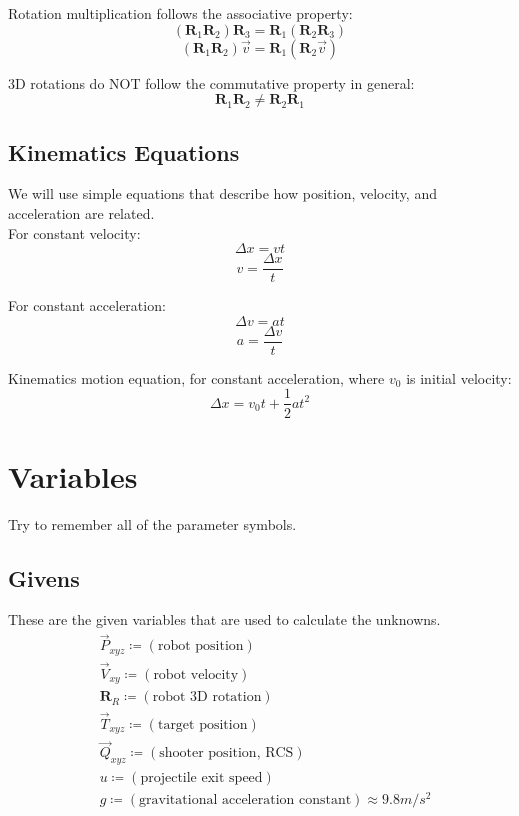 \documentclass{article}
\begin{document}
Rotation multiplication follows the associative property:
\[ (\boldsymbol{R}_1\boldsymbol{R}_2)\boldsymbol{R}_3=\boldsymbol{R}_1(\boldsymbol{R}_2\boldsymbol{R}_3) \]
\[ (\boldsymbol{R}_1\boldsymbol{R}_2)\vec{v}=\boldsymbol{R}_1(\boldsymbol{R}_2\vec{v}) \]

3D rotations do NOT follow the commutative property in general:
$$\boldsymbol{R}_1\boldsymbol{R}_2\ne\boldsymbol{R}_2\boldsymbol{R}_1$$

\subsection*{Kinematics Equations}
We will use simple equations that describe how position, velocity, and acceleration are related. \\

For constant velocity:
\[ \Delta x=vt \]
\[ v=\frac{\Delta x}{t} \]

For constant acceleration:
\[ \Delta v=at \]
\[ a=\frac{\Delta v}{t} \]

Kinematics motion equation, for constant acceleration, where $v_0$ is initial velocity:
\[ \Delta x=v_0t+\frac{1}{2}at^2 \]

\section*{Variables}
Try to remember all of the parameter symbols.

\subsection*{Givens}
These are the given variables that are used to calculate the unknowns.
\begin{align*}
    &\vec{P}_{xyz}\coloneqq(\text{robot position}) \\
    &\vec{V}_{xy}\coloneqq(\text{robot velocity}) \\
    &\boldsymbol{R}_R\coloneqq(\text{robot 3D rotation}) \\
    &\vec{T}_{xyz}\coloneqq(\text{target position})\\
    &\vec{Q}_{xyz}\coloneqq(\text{shooter position, RCS}) \\
    &u\coloneqq(\text{projectile exit speed}) \\
    &g\coloneqq(\text{gravitational acceleration constant})\approx9.8m/s^2 \\
\end{align*}
\end{document}
